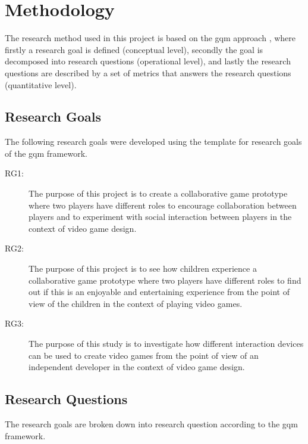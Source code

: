 \chapter{Methodology}
The research method used in this project is based on the \gls{gqm} approach \cite{1992basili}, where firstly a research goal is defined (conceptual level), secondly the goal is decomposed into research questions (operational level), and lastly the research questions are described by a set of metrics that answers the research questions (quantitative level).


\section{Research Goals}
The following research goals were developed using the template for research goals of the \gls{gqm} framework.
\begin{description}
	\item[RG1:] The purpose of this project is to create a collaborative game prototype where two players have different roles to encourage collaboration between players and to experiment with social interaction between players in the context of video game design.
	
	\item[RG2:] The purpose of this project is to see how children experience a collaborative game prototype where two players have different roles to find out if this is an enjoyable and entertaining experience from the point of view of the children in the context of playing video games.
	
	\item[RG3:] The purpose of this study is to investigate how different interaction devices can be used to create video games from the point of view of an independent developer in the context of video game design. 
\end{description}




\section{Research Questions}
The research goals are broken down into research question according to the \gls{gqm} framework.
